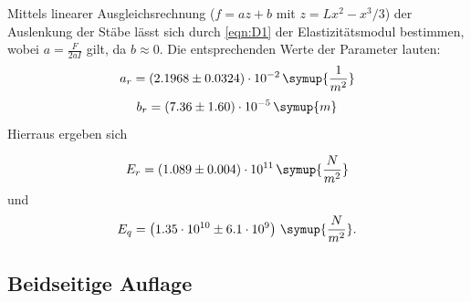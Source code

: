 Mittels linearer Ausgleichsrechnung ($f = a z +b$ mit $z = Lx^2-x^3/3$) der Auslenkung der Stäbe lässt sich durch \eqref{eqn:D1} der Elastizitätsmodul bestimmen, wobei $a = \frac{F}{2aI}$ gilt, da $b \approx 0$. Die entsprechenden Werte der Parameter lauten:
\begin{equation}
  a_r = \left( 2.1968\pm 0.0324 \right)  \cdot 10^{-2}  \, \symup{\frac{1}{m^2}}
  \label{eqn:ar}
\end{equation}
\begin{equation}
  b_r = \left(7.36 \pm 1.60 \right) \cdot 10^{-5} \, \symup{m}
  \label{eqn:br}
\end{equation}
 Hierraus ergeben sich

\begin{equation*}
  E_r = \left(1.089 \pm 0.004\right)\cdot 10^{11} \, \symup{\frac{N}{m^2}}
\end{equation*}
und
\begin{equation*}
  E_q = \left(1.35\cdot 10^{10} \pm 6.1 \cdot 10^{9} \right) \, \symup{\frac{N}{m^2}}.
\end{equation*}



\subsection{Beidseitige Auflage}
\label{sec:Beidseitig}

